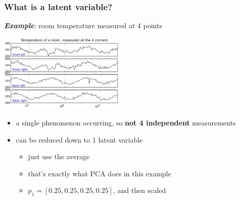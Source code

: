 \begin{frame}\frametitle{What is a latent variable?}

	\textbf{\emph{Example}}: room temperature measured at 4 points
	
	\begin{center}
		\includegraphics[width=6cm]{images/room-temperature-plots.jpg}
	\end{center}
	
	\begin{itemize}
		\item	a single phenomenon occurring, so \textbf{not 4 independent}  measurements
		
		\item	can be reduced down to 1 latent variable
		
				\begin{itemize}
					\item	just use the average
					
					\item	that's exactly what PCA does in this example
					
					\item	\( p_1 = [0.25,  0.25, 0.25, 0.25 ] \), and then scaled
				\end{itemize}
		
	\end{itemize}
	
	

\end{frame}

